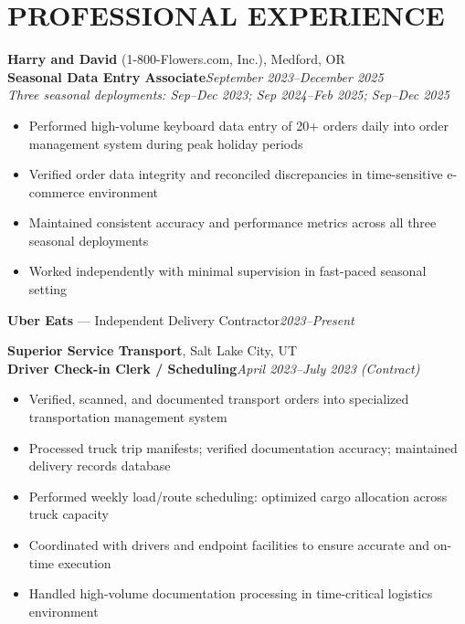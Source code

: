 \documentclass[9pt,letterpaper]{extarticle}
\begin{document}
\section*{PROFESSIONAL EXPERIENCE}

\noindent\textbf{Harry and David} (1-800-Flowers.com, Inc.), Medford, OR\\
\textbf{Seasonal Data Entry Associate}\hfill\textit{September 2023--December 2025}\\
\textit{Three seasonal deployments: Sep--Dec 2023; Sep 2024--Feb 2025; Sep--Dec 2025}
\begin{itemize}
  \item Performed high-volume keyboard data entry of 20+ orders daily into order management system during peak holiday periods
  \item Verified order data integrity and reconciled discrepancies in time-sensitive e-commerce environment
  \item Maintained consistent accuracy and performance metrics across all three seasonal deployments
  \item Worked independently with minimal supervision in fast-paced seasonal setting
\end{itemize}

\vspace{3pt}
\noindent\textbf{Uber Eats} --- Independent Delivery Contractor\hfill\textit{2023--Present}

\vspace{5pt}
\noindent\textbf{Superior Service Transport}, Salt Lake City, UT\\
\textbf{Driver Check-in Clerk / Scheduling}\hfill\textit{April 2023--July 2023 (Contract)}
\begin{itemize}
  \item Verified, scanned, and documented transport orders into specialized transportation management system
  \item Processed truck trip manifests; verified documentation accuracy; maintained delivery records database
  \item Performed weekly load/route scheduling: optimized cargo allocation across truck capacity
  \item Coordinated with drivers and endpoint facilities to ensure accurate and on-time execution
  \item Handled high-volume documentation processing in time-critical logistics environment
\end{itemize}
\end{document}
